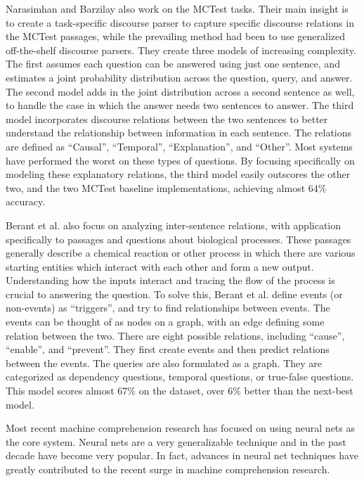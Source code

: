 \documentclass[pageno]{final_paper}
\begin{document}
Narasimhan and Barzilay \cite{Narasimhan2015} also work on the MCTest tasks.
Their main insight is to create a task-specific discourse parser to capture
specific discourse relations in the MCTest passages, while the prevailing method
had been to use generalized off-the-shelf discourse parsers. They create three
models of increasing complexity. The first assumes each question can be answered
using just one sentence, and estimates a joint probability distribution across
the question, query, and answer. The second model adds in the joint distribution
across a second sentence as well, to handle the case in which the answer needs
two sentences to answer. The third model incorporates discourse relations
between the two sentences to better understand the relationship between
information in each sentence. The relations are defined as ``Causal'',
``Temporal'', ``Explanation'', and ``Other''. Most systems have performed the
worst on these types of questions. By focusing specifically on modeling these
explanatory relations, the third model easily outscores the other two, and the
two MCTest baseline implementations, achieving almost 64\% accuracy.

Berant et al. \cite{Berant2014} also focus on analyzing inter-sentence
relations, with application specifically to passages and questions about
biological processes. These passages generally describe a chemical reaction or
other process in which there are various starting entities which interact with
each other and form a new output. Understanding how the inputs interact and
tracing the flow of the process is crucial to answering the question. To solve
this, Berant et al. define events (or non-events) as ``triggers'', and try to
find relationships between events. The events can be thought of as nodes on a
graph, with an edge defining some relation between the two. There are eight
possible relations, including ``cause'', ``enable'', and ``prevent''. They first
create events and then predict relations between the events. The queries are
also formulated as a graph. They are categorized as dependency questions,
temporal questions, or true-false questions. This model scores almost 67\% on
the dataset, over 6\% better than the next-best model.

Most recent machine comprehension research has focused on using neural nets as
the core system. Neural nets are a very generalizable technique and in the past
decade have become very popular. In fact, advances in neural net techniques have
greatly contributed to the recent surge in machine comprehension research.
\end{document}

